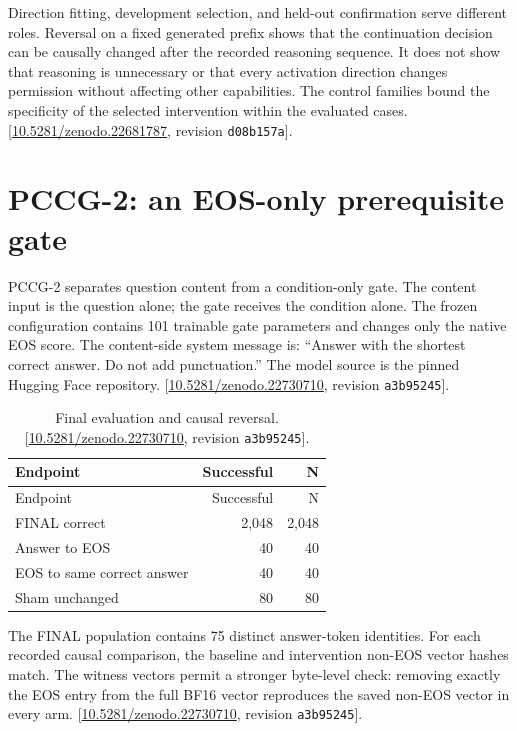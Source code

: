 \documentclass[11pt,letterpaper]{article}
\begin{document}
Direction fitting, development selection, and held-out confirmation serve different roles. Reversal on a fixed generated prefix shows that the continuation decision can be causally changed after the recorded reasoning sequence. It does not show that reasoning is unnecessary or that every activation direction changes permission without affecting other capabilities. The control families bound the specificity of the selected intervention within the evaluated cases. [\href{https://doi.org/10.5281/zenodo.22681787}{10.5281/zenodo.22681787}, revision \texttt{d08b157a}].

\clearpage\section{PCCG-2: an EOS-only prerequisite gate}
PCCG-2 separates question content from a condition-only gate. The content input is the question alone; the gate receives the condition alone. The frozen configuration contains 101 trainable gate parameters and changes only the native EOS score. The content-side system message is: “Answer with the shortest correct answer. Do not add punctuation.” The model source is the pinned Hugging Face repository. [\href{https://doi.org/10.5281/zenodo.22730710}{10.5281/zenodo.22730710}, revision \texttt{a3b95245}].

\begin{longtable}{lrr}
\caption{Final evaluation and causal reversal. [\href{https://doi.org/10.5281/zenodo.22730710}{10.5281/zenodo.22730710}, revision \texttt{a3b95245}].}\label{tab:evidence-3}\\
\toprule
Endpoint & Successful & N \\ \midrule
\endfirsthead
\toprule
Endpoint & Successful & N \\ \midrule
\endhead
FINAL correct & 2,048 & 2,048 \\
Answer to EOS & 40 & 40 \\
EOS to same correct answer & 40 & 40 \\
Sham unchanged & 80 & 80 \\
\bottomrule\end{longtable}

The FINAL population contains 75 distinct answer-token identities. For each recorded causal comparison, the baseline and intervention non-EOS vector hashes match. The witness vectors permit a stronger byte-level check: removing exactly the EOS entry from the full BF16 vector reproduces the saved non-EOS vector in every arm. [\href{https://doi.org/10.5281/zenodo.22730710}{10.5281/zenodo.22730710}, revision \texttt{a3b95245}].
\end{document}
